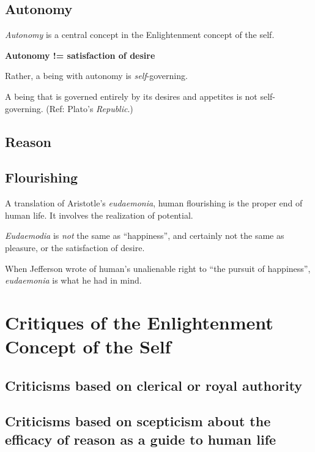 \documentclass[
]{book}
\begin{document}
\hypertarget{autonomy}{%
\section{Autonomy}\label{autonomy}}

\emph{Autonomy} is a central concept in the Enlightenment concept of the self.

\textbf{Autonomy != satisfaction of desire}

Rather, a being with autonomy is \emph{self}-governing.

A being that is governed entirely by its desires and appetites is not self-governing.
(Ref: Plato's \emph{Republic}.)

\hypertarget{reason}{%
\section{Reason}\label{reason}}

\hypertarget{flourishing}{%
\section{Flourishing}\label{flourishing}}

A translation of Aristotle's \emph{eudaemonia}, human flourishing is the proper end of human life. It involves the realization of potential.

\emph{Eudaemodia} is \emph{not} the same as ``happiness'', and certainly not the same as pleasure, or the satisfaction of desire.

When Jefferson wrote of human's unalienable right to ``the pursuit of happiness'', \emph{eudaemonia} is what he had in mind.

\hypertarget{critiques-of-the-enlightenment-concept-of-the-self}{%
\chapter{Critiques of the Enlightenment Concept of the Self}\label{critiques-of-the-enlightenment-concept-of-the-self}}

\hypertarget{criticisms-based-on-clerical-or-royal-authority}{%
\section{Criticisms based on clerical or royal authority}\label{criticisms-based-on-clerical-or-royal-authority}}

\hypertarget{criticisms-based-on-scepticism-about-the-efficacy-of-reason-as-a-guide-to-human-life}{%
\section{Criticisms based on scepticism about the efficacy of reason as a guide to human life}\label{criticisms-based-on-scepticism-about-the-efficacy-of-reason-as-a-guide-to-human-life}}
\end{document}
